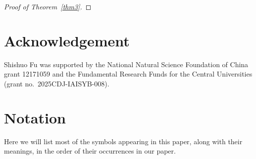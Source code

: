 \documentclass[12pt,reqno]{amsart}
\numberwithin{equation}{section}
\begin{document}
\begin{proof}[Proof of Theorem~\ref{thm3}]
	
	
	
	
	
	
	

	
	
	
	
	
	
	
	
	
	
	
		
	
		
	
	
	
	
	
	
	
	
	
	
	
	
	
	
	
	
	
	
	
	
	
	
	
	
	
	
	
	
	
	
	
  
	
	
	
	
	
	
	
	
	
	
\end{proof}



\section*{Acknowledgement}
Shishuo Fu was supported by the National Natural Science Foundation of China grant 12171059 and the Fundamental Research Funds for the Central Universities (grant no.~2025CDJ-IAISYB-008).


\newpage 
\appendix

\section{Notation}
Here we will list most of the symbols appearing in this paper, along with their meanings, in the order of their occurrences in our paper.
\end{document}
